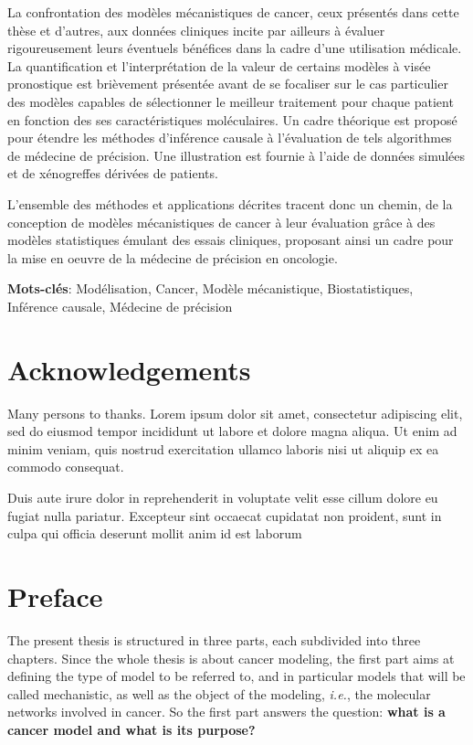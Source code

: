 \documentclass[a4paper,12pt,twoside,onecolumn,openright,final,oldfontcommands]{memoir}
\newcommand{\initial}[1]{
	\lettrine[lines=3,lhang=0.33,nindent=0em]{
		\color{gray}
     		{\textsc{#1}}}{}}
\newcommand\blankpage{%
    \null
    \thispagestyle{empty}%
    \newpage
    }
\newcommand{\clearemptydoublepage}{\newpage{\thispagestyle{empty}\cleardoublepage}}
\begin{document}
La confrontation des modèles mécanistiques de cancer, ceux présentés
dans cette thèse et d'autres, aux données cliniques incite par ailleurs
à évaluer rigoureusement leurs éventuels bénéfices dans la cadre d'une
utilisation médicale. La quantification et l'interprétation de la valeur
de certains modèles à visée pronostique est brièvement présentée avant
de se focaliser sur le cas particulier des modèles capables de
sélectionner le meilleur traitement pour chaque patient en fonction des
ses caractéristiques moléculaires. Un cadre théorique est proposé pour
étendre les méthodes d'inférence causale à l'évaluation de tels
algorithmes de médecine de précision. Une illustration est fournie à
l'aide de données simulées et de xénogreffes dérivées de patients.

L'ensemble des méthodes et applications décrites tracent donc un chemin,
de la conception de modèles mécanistiques de cancer à leur évaluation
grâce à des modèles statistiques émulant des essais cliniques, proposant
ainsi un cadre pour la mise en oeuvre de la médecine de précision en
oncologie.

\vspace{\baselineskip}

\textbf{Mots-clés}: Modélisation, Cancer, Modèle mécanistique,
Biostatistiques, Inférence causale, Médecine de précision

\afterpage{\blankpage}

\chapter*{Acknowledgements}

\initial{M}any persons to thanks. Lorem ipsum dolor sit amet,
consectetur adipiscing elit, sed do eiusmod tempor incididunt ut labore
et dolore magna aliqua. Ut enim ad minim veniam, quis nostrud
exercitation ullamco laboris nisi ut aliquip ex ea commodo consequat.

Duis aute irure dolor in reprehenderit in voluptate velit esse cillum
dolore eu fugiat nulla pariatur. Excepteur sint occaecat cupidatat non
proident, sunt in culpa qui officia deserunt mollit anim id est laborum

\clearemptydoublepage

\chapter*{Preface}

\initial{T}he present thesis is structured in three parts, each
subdivided into three chapters. Since the whole thesis is about cancer
modeling, the first part aims at defining the type of model to be
referred to, and in particular models that will be called mechanistic,
as well as the object of the modeling, \emph{i.e.}, the molecular
networks involved in cancer. So the first part answers the question:
\textbf{what is a cancer model and what is its purpose?}
\end{document}
